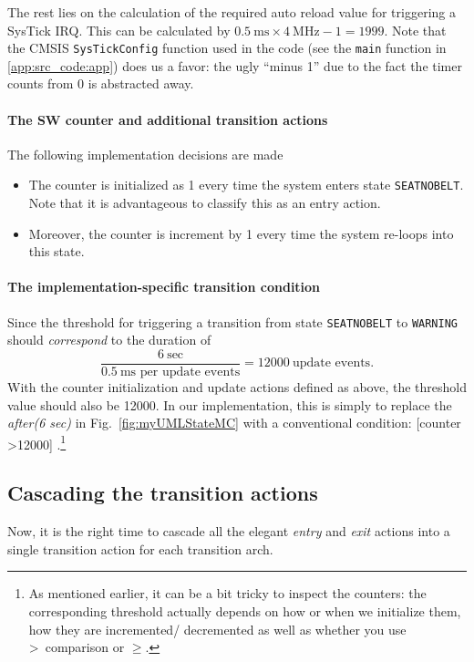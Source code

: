 \documentclass[12pt,a4paper]{scrartcl}
\begin{document}
			The rest lies on the calculation of the required auto reload value for triggering a SysTick IRQ. 
			This can be calculated by $0.5~\text{ms} \times 4~\text{MHz} -1 = 1999$. 
			Note that the CMSIS \texttt{SysTick\textunderscore Config} function used in the code (see the \texttt{main} function in \ref{app:src_code:app}) does us a favor: 
			the ugly ``minus 1'' due to the fact the timer counts from 0 is abstracted away.
			
		\paragraph{The SW counter and additional transition actions}
			The following implementation decisions are made
			\begin{itemize}
				\item The counter is initialized as 1 every time the system enters state \texttt{SEAT\textunderscore NO\textunderscore BELT}.
				Note that it is advantageous to classify this as an entry action.
				\item Moreover, the counter is increment by 1 every time the system re-loops into this state.
			\end{itemize}
		\paragraph{The implementation-specific transition condition}
			Since the threshold for triggering a transition from state \texttt{SEAT\textunderscore NO\textunderscore BELT}
			to \texttt{WARNING} should \textit{correspond} to the duration of 
			$$\frac{6~ \text{sec}}{0.5~\text{ms per update events}} = 12000~\text{update events}. 		$$	
			With the counter initialization and update actions defined as above, the threshold value should also be 12000.
			In our implementation, this is simply to replace the \textit{after(6 sec)} in Fig.~\ref{fig:myUMLStateMC}
			with a conventional condition:
			\hfill
				[counter \textgreater 12000]
			\hfill.\footnote{As mentioned earlier, it can be a bit tricky to inspect the counters: the corresponding threshold actually depends on how or when we initialize them, how they are incremented/ decremented as well as whether you use \textgreater ~comparison or $\geq$.}
	
	\subsection{Cascading the transition actions} \label{sec:FSM:cascade}
		Now, it is the right time to cascade all
		the elegant \textit{entry} and \textit{exit} actions
		into a single transition action for each transition arch.
		
\end{document}
